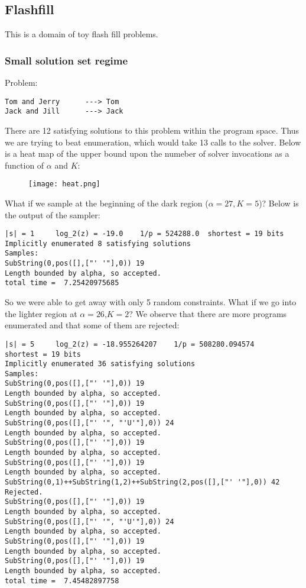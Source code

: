 \documentclass{article}
\begin{document}
\subsection{Flashfill}
This is a domain of toy flash fill problems.

\subsubsection{Small solution set regime}
Problem:
\begin{verbatim}
Tom and Jerry      ---> Tom
Jack and Jill      ---> Jack
\end{verbatim}
There are 12 satisfying solutions to this problem within the program space.
Thus we are trying to beat enumeration, which would take 13 calls to the solver.
Below is a heat map of the upper bound upon the numeber of solver invocations as a function of $\alpha$ and $K$:
\begin{figure}
  \texttt{[image: heat.png]}
\end{figure}
What if we sample at the beginning of the dark region ($\alpha = 27,K = 5$)? Below is the output of the sampler:
\begin{verbatim}
|s| = 1 	log_2(z) = -19.0 	1/p = 524288.0 	shortest = 19 bits
Implicitly enumerated 8 satisfying solutions
Samples:
SubString(0,pos([],["' '"],0)) 19
Length bounded by alpha, so accepted.
total time =  7.25420975685
\end{verbatim}
So we were able to get away with only 5 random constraints. What if we go into the lighter region at $\alpha = 26$,$K = 2$? We observe that there are more programs enumerated and that some of them are rejected:
\begin{verbatim}
|s| = 5 	log_2(z) = -18.955264207 	1/p = 508280.094574 	shortest = 19 bits
Implicitly enumerated 36 satisfying solutions
Samples:
SubString(0,pos([],["' '"],0)) 19
Length bounded by alpha, so accepted.
SubString(0,pos([],["' '"],0)) 19
Length bounded by alpha, so accepted.
SubString(0,pos([],["' '", "'U'"],0)) 24
Length bounded by alpha, so accepted.
SubString(0,pos([],["' '"],0)) 19
Length bounded by alpha, so accepted.
SubString(0,pos([],["' '"],0)) 19
Length bounded by alpha, so accepted.
SubString(0,1)++SubString(1,2)++SubString(2,pos([],["' '"],0)) 42
Rejected.
SubString(0,pos([],["' '"],0)) 19
Length bounded by alpha, so accepted.
SubString(0,pos([],["' '", "'U'"],0)) 24
Length bounded by alpha, so accepted.
SubString(0,pos([],["' '"],0)) 19
Length bounded by alpha, so accepted.
SubString(0,pos([],["' '"],0)) 19
Length bounded by alpha, so accepted.
total time =  7.45482897758
\end{verbatim}
\end{document}

